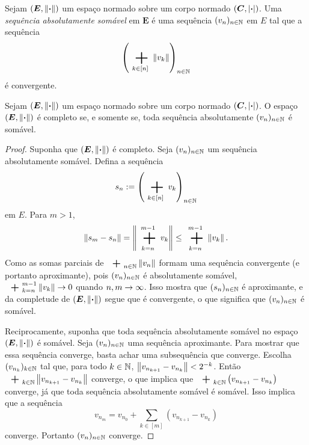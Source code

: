 \begin{definition}
Sejam $(\bm E,\left\Vert{\bm{\cdot}}\right\Vert)$ um espaço normado sobre um corpo normado $(\bm C,\left\vert{\bm{\cdot}}\right\vert)$. Uma \emph{sequência absolutamente somável} em $\bm E$ é uma sequência $(v_n)_{n \in \mathbb{N}}$ em $E$ tal que a sequência
	\begin{equation*}
	\left( \sum_{k \in [n]} \nor{v_k} \right)_{n \in \N}
	\end{equation*}
é convergente.
\end{definition}

\begin{proposition}
\label{ana:prop.abs.som.e.som}
Sejam $(\bm E,\left\Vert{\bm{\cdot}}\right\Vert)$ um espaço normado sobre um corpo normado $(\bm C,\left\vert{\bm{\cdot}}\right\vert)$. O espaço $(\bm E,\left\Vert{\bm{\cdot}}\right\Vert)$ é completo se, e somente se, toda sequência absolutamente $(v_n)_{n \in \mathbb{N}}$ é somável.
\end{proposition}
\begin{proof}
Suponha que $(\bm E,\left\Vert{\bm{\cdot}}\right\Vert)$ é completo. Seja $(v_n)_{n \in \mathbb{N}}$ um sequência absolutamente somável. Defina a sequência
	\begin{equation*}
	s_n := \left( \sum_{k \in [n]} v_k \right)_{n \in \N}
	\end{equation*}
em $E$. Para $m>1$,
	\begin{equation*}
	\nor{s_m - s_n} = \nor{\sum_{k=n}^{m-1} v_k} \leq \sum_{k=n}^{m-1} \nor{v_k}.
	\end{equation*}
Como as somas parciais de $\sum_{n \in \N} \nor{v_n}$ formam uma sequência convergente (e portanto aproximante), pois $(v_n)_{n \in \mathbb{N}}$ é absolutamente somável, $\sum_{k=n}^{m-1} \nor{v_k} \conv 0$ quando $n,m \rightarrow \infty$. Isso mostra que $(s_n)_{n \in \mathbb{N}}$ é aproximante, e da completude de $(\bm E,\left\Vert{\bm{\cdot}}\right\Vert)$ segue que é convergente, o que significa que $(v_n)_{n \in \mathbb{N}}$ é somável.

Reciprocamente, suponha que toda sequência absolutamente somável no espaço $(\bm E,\left\Vert{\bm{\cdot}}\right\Vert)$ é somável. Seja $(v_n)_{n \in \mathbb{N}}$ uma sequência aproximante. Para mostrar que essa sequência converge, basta achar uma subsequência que converge. Escolha $(v_{n_k})_{k \in \mathbb{N}}$ tal que, para todo $k \in \mathbb{N}$, $\left\Vert{v_{n_{k+1}} - v_{n_k}}\right\Vert < 2^{-k}$. Então $\sum_{k \in \N} \nor{v_{n_{k+1}} - v_{n_k}}$ converge, o que implica que $\sum_{k \in \N} \left( v_{n_{k+1}} - v_{n_k} \right)$ converge, já que toda sequência absolutamente somável é somável. Isso implica que a sequência
	\begin{equation*}
	v_{n_m} = v_{n_0} + \sum_{k \in [m]} \left( v_{n_{k+1}} - v_{n_k} \right)                                                                                                                                                                                                                                                                                                                                                                                                                                                                                                                                                                                               \end{equation*}
converge. Portanto $(v_n)_{n \in \mathbb{N}}$ converge.
\end{proof}


